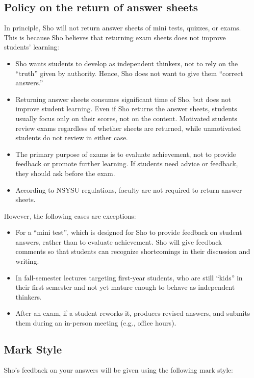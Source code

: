 \documentclass[11pt,pdfa,lastpage,minititle]{MishoNote}
\begin{document}
\subsection*{Policy on the return of answer sheets}
In principle, Sho will not return answer sheets of mini tests, quizzes, or exams.
This is because Sho believes that returning exam sheets does not improve students' learning:
\begin{itemize}
  \item Sho wants students to develop as independent thinkers, not to rely on the ``truth'' given by authority. Hence, Sho does not want to give them ``correct answers.''
  \item Returning answer sheets consumes significant time of Sho, but does not improve student learning. Even if Sho returns the answer sheets, students usually focus only on their scores, not on the content. Motivated students review exams regardless of whether sheets are returned, while unmotivated students do not review in either case.
  \item The primary purpose of exams is to evaluate achievement, not to provide feedback or promote further learning. If students need advice or feedback, they should ask before the exam.
  \item According to NSYSU regulations, faculty are not required to return answer sheets.
\end{itemize}
 However, the following cases are exceptions:
\begin{itemize}
  \item For a ``mini test'', which is designed for Sho to provide feedback on student answers, rather than to evaluate achievement. Sho will give feedback comments so that students can recognize shortcomings in their discussion and writing.
  \item In fall-semester lectures targeting first-year students, who are still ``kids'' in their first semester and not yet mature enough to behave as independent thinkers.
  \item After an exam, if a student reworks it, produces revised answers, and submits them during an in-person meeting (e.g., office hours).
\end{itemize}

\subsection*{Mark Style}
Sho's feedback on your answers will be given using the following mark style:
\end{document}
